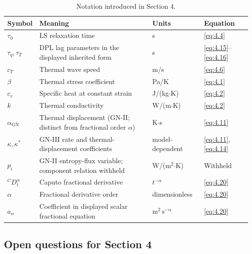 \begin{table}[htbp]
\centering
\small
\caption{Notation introduced in Section 4.}
\label{tab:notation-sec4}
\begin{tabularx}{\textwidth}{@{}p{1.8cm}X p{2.2cm}p{2.1cm}@{}}
\toprule
\textbf{Symbol} & \textbf{Meaning} & \textbf{Units} & \textbf{Equation} \\
\midrule
$\tau_0$ & LS relaxation time & s & \eqref{eq:4.4} \\
$\tau_q, \tau_T$ & DPL lag parameters in the displayed inherited form & s & \eqref{eq:4.15}--\eqref{eq:4.16} \\
$c_T$ & Thermal wave speed & m/s & \eqref{eq:4.6} \\
$\beta$ & Thermal stress coefficient & Pa/K & \eqref{eq:4.1} \\
$c_v$ & Specific heat at constant strain & J/(kg$\cdot$K) & \eqref{eq:4.2} \\
$k$ & Thermal conductivity & W/(m$\cdot$K) & \eqref{eq:4.2} \\
$\alpha_{\mathrm{GN}}$ & Thermal displacement (GN-II; distinct from fractional order $\alpha$) & K$\cdot$s & \eqref{eq:4.11} \\
$\kappa,\kappa^*$ & GN-III rate and thermal-displacement coefficients & model-dependent & \eqref{eq:4.11}, \eqref{eq:4.14} \\
$p_i$ & GN-II entropy-flux variable; component relation withheld & W/(m$^2$$\cdot$K) & Withheld \\
${}^C D_t^\alpha$ & Caputo fractional derivative & $t^{-\alpha}$ & \eqref{eq:4.20} \\
$\alpha$ & Fractional derivative order & dimensionless & \eqref{eq:4.20} \\
$a_\alpha$ & Coefficient in displayed scalar fractional equation & $\mathrm{m^2\,s^{-\alpha}}$ & \eqref{eq:4.20} \\
\bottomrule
\end{tabularx}
\end{table}

\subsection{Open questions for Section 4}

